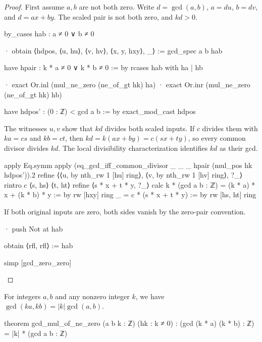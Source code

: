 \begin{proof}

  First assume $a,b$ are not both zero. Write $d=\gcd(a,b)$, $a=du$, $b=dv$, and $d=ax+by$. The scaled pair is not both zero, and $kd>0$.

  \begin{lean}
    by_cases hab : a ≠ 0 ∨ b ≠ 0

    · obtain ⟨hdpos, ⟨u, hu⟩, ⟨v, hv⟩, ⟨x, y, hxy⟩, _⟩ := gcd_spec a b hab

      have hpair : k * a ≠ 0 ∨ k * b ≠ 0 := by
        rcases hab with ha | hb

        · exact Or.inl (mul_ne_zero (ne_of_gt hk) ha)
        · exact Or.inr (mul_ne_zero (ne_of_gt hk) hb)

      have hdpos' : (0 : ℤ) < gcd a b := by
        exact_mod_cast hdpos
  \end{lean}

  The witnesses $u,v$ show that $kd$ divides both scaled inputs. If $c$ divides them with $ka=cs$ and $kb=ct$, then $kd=k(ax+by)=c(sx+ty)$, so every common divisor divides $kd$. The local divisibility characterization identifies $kd$ as their gcd.

  \begin{lean}
    apply Eq.symm
    apply (eq_gcd_iff_common_divisor _ _ _ hpair (mul_pos hk hdpos')).2
    refine ⟨⟨u, by
      nth_rw 1 [hu]
      ring⟩, ⟨v, by
        nth_rw 1 [hv]
        ring⟩, ?_⟩
    rintro c ⟨s, hs⟩ ⟨t, ht⟩
    refine ⟨s * x + t * y, ?_⟩
    calc
      k * (gcd a b : ℤ) = (k * a) * x + (k * b) * y := by
        rw [hxy]
        ring
      _ = c * (s * x + t * y) := by
        rw [hs, ht]
        ring
  \end{lean}

  If both original inputs are zero, both sides vanish by the zero-pair convention.

  \begin{lean}
    · push Not at hab

      obtain ⟨rfl, rfl⟩ := hab

      simp [gcd_zero_zero]
  \end{lean}

\end{proof}

\begin{corollary} \label{nt:thm:gcd-nonzero-factor}
  For integers $a,b$ and any nonzero integer $k$, we have $\gcd(ka,kb)=|k|\gcd(a,b)$.

  \begin{lean}
    theorem gcd_mul_of_ne_zero (a b k : ℤ) (hk : k ≠ 0) :
        (gcd (k * a) (k * b) : ℤ) = |k| * (gcd a b : ℤ)
  \end{lean}
\end{corollary}

